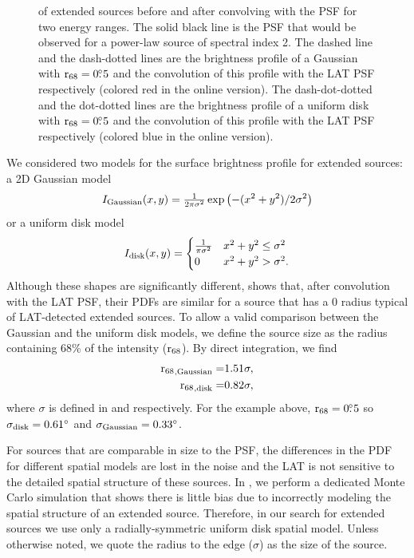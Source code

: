 \begin{figure}[htbp]
{    of extended sources before and after convolving with the PSF for two
    energy ranges.  The solid black line is the PSF that would be observed
    for a power-law source of spectral index 2. The dashed line
    and the dash-dotted lines are 
    the brightness profile of a Gaussian with ${\mathrm{r}_{68}}=0\mbox{$.\!\!^\circ$}5$
    and the convolution of this profile with the LAT PSF respectively
    (colored red in the online version).
    The dash-dot-dotted and the dot-dotted lines are the brightness profile
    of a uniform disk with ${\mathrm{r}_{68}}=0\mbox{$.\!\!^\circ$}5$ and the convolution
    of this profile with the LAT PSF respectively (colored blue in the online version).
    }
  \end{figure}


We considered two models for the
surface brightness profile for extended sources: a 2D Gaussian model
\begin{equation}\eqnlabel{gauss_pdf}
  I_\text{Gaussian}(x,y)=\tfrac{1}{2\pi\sigma^2}\exp\left(-(x^2+y^2)/2\sigma^2\right)
\end{equation}
or a uniform disk model
\begin{equation}\eqnlabel{disk_pdf}
  I_\text{disk}(x,y)=
  \begin{cases}
    \frac{1}{\pi\sigma^2} & x^2+y^2\le\sigma^2 \\
    0                      & x^2+y^2>\sigma^2.
  \end{cases}
\end{equation}
Although these shapes are significantly different,
 shows that, after convolution with the
LAT PSF, their PDFs are similar for a source that has a 0 radius
typical of LAT-detected extended sources.  To allow a valid comparison
between the Gaussian and the uniform disk models,
we define the source size as the radius containing 68\% of the
intensity (${\mathrm{r}_{68}}$). 
By direct integration, we find
\begin{align}
{\ensuremath{\mathrm{r}_{68}}}_\text{,Gaussian}=&1.51\sigma, \\
{\mathrm{r}_{68}}_\text{,disk}=&0.82\sigma, 
\end{align}
where $\sigma$ is defined
in  and  respectively.
For the example above, ${\mathrm{r}_{68}}=0\mbox{$.\!\!^\circ$}5$ so $\sigma_\text{disk}=0.61^\circ$
and $\sigma_\text{Gaussian}=0.33^\circ$.

For sources that are comparable in size to the PSF,
the differences in the PDF for
different spatial models are lost in the noise and the LAT is not sensitive
to the detailed spatial structure of these sources.  
In , we perform a dedicated Monte Carlo simulation
that shows there is little bias due to incorrectly modeling the spatial structure
of an extended source.
Therefore, in our search for extended sources we use only a radially-symmetric uniform
disk spatial model. Unless otherwise noted,
we quote the radius to the edge ($\sigma$) as the size of the source.

